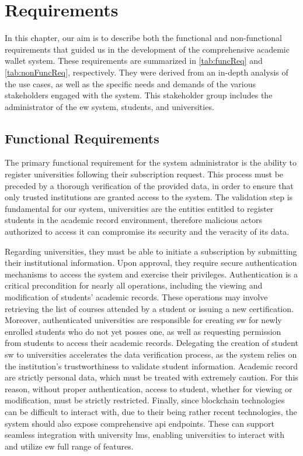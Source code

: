\chapter{Requirements}
\label{chap:requirements}
In this chapter, our aim is to describe both the functional and non-functional requirements that guided us in the development of the comprehensive academic wallet system. These requirements are summarized in \cref{tab:funcReq} and \cref{tab:nonFuncReq}, respectively. They were derived from an in-depth analysis of the use cases, as well as the specific needs and demands of the various stakeholders engaged with the system. This stakeholder group includes the administrator of the \acrfull{ew} system, students, and universities.

\section{Functional Requirements}
The primary functional requirement for the system administrator is the ability to register universities following their subscription request. This process must be preceded by a thorough verification of the provided data, in order to ensure that only trusted institutions are granted access to the system. The validation step is fundamental for our system, universities are the entities entitled to register students in the academic record environment, therefore malicious actors authorized to access it can compromise its security and the veracity of its data.

Regarding universities, they must be able to initiate a subscription by submitting their institutional information. Upon approval, they require secure authentication mechanisms to access the system and exercise their privileges. Authentication is a critical precondition for nearly all operations, including the viewing and modification of students' academic records. These operations may involve retrieving the list of courses attended by a student or issuing a new certification. Moreover, authenticated universities are responsible for creating \acrfull{sw} for newly enrolled students who do not yet posses one, as well as requesting permission from students to access their academic records. Delegating the creation of student \acrshort{sw} to universities accelerates the data verification process, as the system relies on the institution's trustworthiness to validate student information. Academic record are strictly personal data, which must be treated with extremely caution. For this reason, without proper authentication, access to student, whether for viewing or modification, must be strictly restricted. Finally, since blockchain technologies can be difficult to interact with, due to their being rather recent technologies, the system should also expose comprehensive \acrfull{api} endpoints. These can support seamless integration with university \acrfull{lms}, enabling universities to interact with and utilize \acrlong{ew} full range of features.

